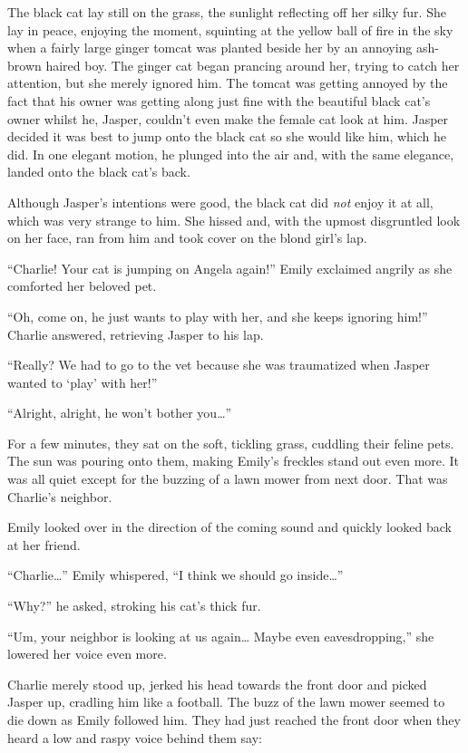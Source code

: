 The black cat lay still on the grass, the sunlight reflecting off her silky fur. She lay in peace, enjoying the moment, squinting at the yellow ball of fire in the sky when a fairly large ginger tomcat was planted beside her by an annoying ash-brown haired boy. The ginger cat began prancing around her, trying to catch her attention, but she merely ignored him. The tomcat was getting annoyed by the fact that his owner was getting along just fine with the beautiful black cat's owner whilst he, Jasper, couldn't even make the female cat look at him. Jasper decided it was best to jump onto the black cat so she would like him, which he did. In one elegant motion, he plunged into the air and, with the same elegance, landed onto the black cat's back.

Although Jasper's intentions were good, the black cat did \textit{not} enjoy it at all, which was very strange to him. She hissed and, with the upmost disgruntled look on her face, ran from him and took cover on the blond girl's lap.

“Charlie! Your cat is jumping on Angela again!” Emily exclaimed angrily as she comforted her beloved pet.

“Oh, come on, he just wants to play with her, and she keeps ignoring him!” Charlie answered, retrieving Jasper to his lap.

“Really? We had to go to the vet because she was traumatized when Jasper wanted to ‘play' with her!”

“Alright, alright, he won't bother you…”

For a few minutes, they sat on the soft, tickling grass, cuddling their feline pets. The sun was pouring onto them, making Emily's freckles stand out even more. It was all quiet except for the buzzing of a lawn mower from next door. That was Charlie's neighbor.

Emily looked over in the direction of the coming sound and quickly looked back at her friend.

“Charlie…” Emily whispered, “I think we should go inside…”

“Why?” he asked, stroking his cat's thick fur.

“Um, your neighbor is looking at us again… Maybe even eavesdropping,” she lowered her voice even more.

Charlie merely stood up, jerked his head towards the front door and picked Jasper up, cradling him like a football. The buzz of the lawn mower seemed to die down as Emily followed him. They had just reached the front door when they heard a low and raspy voice behind them say:

